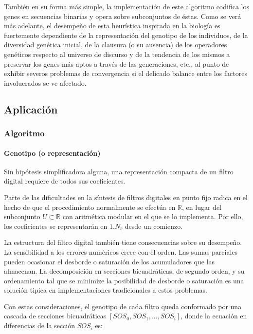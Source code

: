 \documentclass[11pt]{article}
\begin{document}
También en su forma más simple, la implementación de este algoritmo
codifica los genes en secuencias binarias y opera sobre subconjuntos de
éstas. Como se verá más adelante, el desempeño de esta heurística
inspirada en la biología es fuertemente dependiente de la representación
del genotipo de los individuos, de la diversidad genética inicial, de la
clausura (o su ausencia) de los operadores genéticos respecto al
universo de discurso y de la tendencia de los mismos a preservar los
genes más aptos a través de las generaciones, etc., al punto de exhibir
severos problemas de convergencia si el delicado balance entre los
factores involucrados se ve afectado.

    \subsection{Aplicación}\label{aplicaciuxf3n}

    \subsubsection{Algoritmo}\label{algoritmo}

\paragraph{Genotipo (o
representación)}\label{genotipo-o-representaciuxf3n}

Sin hipótesis simplificadora alguna, una representación compacta de un
filtro digital requiere de todos sus coeficientes.

Parte de las dificultades en la síntesis de filtros digitales en punto
fijo radica en el hecho de que el procedimiento normalmente se efectúa
en \(\mathbb{R}\), en lugar del subconjunto \(U \subset \mathbb{R}\) con
aritmética modular en el que se lo implementa. Por ello, los
coeficientes se representarán en \(1.N_b\) desde un comienzo.

La estructura del filtro digital también tiene consecuencias sobre su
desempeño. La sensibilidad a los errores numéricos crece con el orden.
Las sumas parciales pueden ocasionar el desborde o saturación de los
acumuladores que las almacenan. La decomposición en secciones
bicuadráticas, de segundo orden, y su ordenamiento tal que se minimize
la posibilidad de desborde o saturación es una solución tipica en
implementaciones tradicionales a estos problemas.

Con estas consideraciones, el genotipo de cada filtro queda conformado
por una cascada de secciones bicuadráticas
\([SOS_0, SOS_1, ..., SOS_i]\), donde la ecuación en diferencias de la
sección \(SOS_i\) es:
\end{document}
